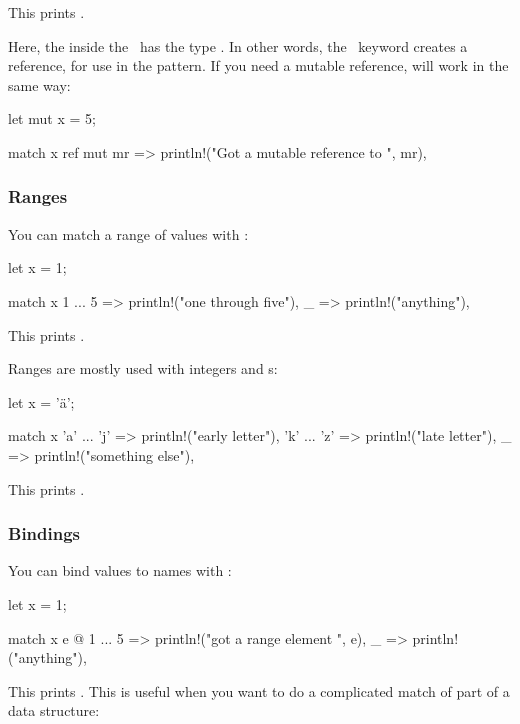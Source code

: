 This prints .

\blank

Here, the  inside the \match\ has the type . In other words, the \keyref\ keyword creates a reference, for 
use in the pattern. If you need a mutable reference, \keyref{} will work in the same way:

\begin{rustc}
let mut x = 5;

match x {
    ref mut mr => println!("Got a mutable reference to {}", mr),
}
\end{rustc}

\subsubsection*{Ranges}

You can match a range of values with :

\begin{rustc}
let x = 1;

match x {
    1 ... 5 => println!("one through five"),
    _ => println!("anything"),
}
\end{rustc}

This prints .

\blank

Ranges are mostly used with integers and \varchar s:

\begin{rustc}
let x = 'ä';

match x {
    'a' ... 'j' => println!("early letter"),
    'k' ... 'z' => println!("late letter"),
    _ => println!("something else"),
}
\end{rustc}

This prints .

\subsubsection*{Bindings}

You can bind values to names with :

\begin{rustc}
let x = 1;

match x {
    e @ 1 ... 5 => println!("got a range element {}", e),
    _ => println!("anything"),
}
\end{rustc}

This prints . This is useful when you want to do a complicated match of part of a data structure:

